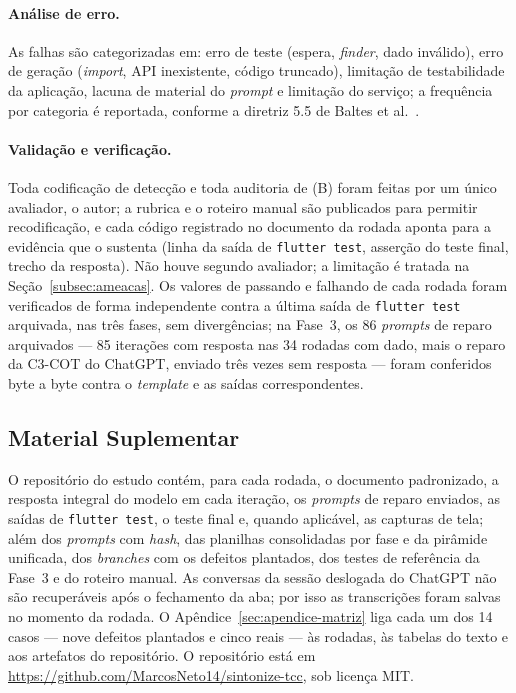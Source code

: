 \documentclass[12pt]{article}
\begin{document}
\paragraph{Análise de erro.} As falhas são categorizadas em: erro de teste
(espera, \textit{finder}, dado inválido), erro de geração (\textit{import},
API inexistente, código truncado), limitação de testabilidade da aplicação,
lacuna de material do \textit{prompt} e limitação do serviço; a frequência
por categoria é reportada, conforme a diretriz 5.5 de Baltes et al.~\cite{baltes2026guidelines}.

\paragraph{Validação e verificação.} Toda codificação de detecção e toda
auditoria de (B) foram feitas por um único avaliador, o autor; a rubrica e o
roteiro manual são publicados para permitir recodificação, e cada código
registrado no documento da rodada aponta para a evidência que o sustenta
(linha da saída de \texttt{flutter test}, asserção do teste final, trecho da
resposta). Não houve segundo avaliador; a limitação é tratada na
Seção~\ref{subsec:ameacas}. Os valores de passando e falhando de cada rodada foram
verificados de forma independente contra a última saída de \texttt{flutter
test} arquivada, nas três fases, sem divergências; na Fase~3, os 86
\textit{prompts} de reparo arquivados --- 85 iterações com resposta nas 34
rodadas com dado, mais o reparo da C3-COT do ChatGPT, enviado três vezes sem
resposta --- foram conferidos byte a byte contra o \textit{template} e as
saídas correspondentes.

\subsection{Material Suplementar}
\label{subsec:suplementar}

O repositório do estudo contém, para cada rodada, o documento padronizado, a
resposta integral do modelo em cada iteração, os \textit{prompts} de reparo
enviados, as saídas de \texttt{flutter test}, o teste final e, quando
aplicável, as capturas de tela; além dos \textit{prompts} com \textit{hash},
das planilhas consolidadas por fase e da pirâmide unificada, dos \textit{branches}
com os defeitos plantados, dos testes de referência da Fase~3 e do roteiro
manual. As conversas da sessão deslogada do ChatGPT não são recuperáveis
após o fechamento da aba; por isso as transcrições foram salvas no momento
da rodada. O Apêndice~\ref{sec:apendice-matriz} liga cada um dos 14 casos
--- nove defeitos plantados e cinco reais --- às rodadas, às tabelas do
texto e aos artefatos do repositório. O repositório está em
\url{https://github.com/MarcosNeto14/sintonize-tcc}, sob licença MIT.
\end{document}

